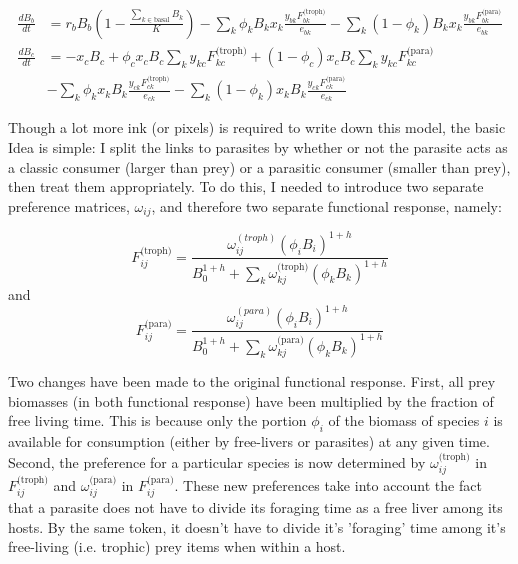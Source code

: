 \documentclass[11pt]{amsart}
\begin{document}
\begin{align}
\frac{dB_{b}}{dt} &= r_bB_b\left(1-\frac{\sum_{k\in\text{basal}}B_k}{K}\right) - \sum_k\phi_kB_kx_k\frac{y_{bk}F_{bk}^\text{(troph)}}{e_{bk}} - \sum_k(1-\phi_k)B_kx_k\frac{y_{bk}F^\text{(para)}_{bk}}{e_{bk}}\label{basalEq1} \\ 
\frac{dB_{c}}{dt} &= -x_cB_c + \phi_cx_cB_c\sum_ky_{kc}F^\text{(troph)}_{kc} + (1-\phi_c)x_cB_c\sum_ky_{kc}F^\text{(para)}_{kc} \label{conEq1}\\ 
&- \sum_k \phi_kx_kB_k\frac{y_{ck}F^\text{(troph)}_{ck}}{e_{ck}} - \sum_k (1-\phi_k)x_kB_k\frac{y_{ck}F^\text{(para)}_{ck}}{e_{ck}}\nonumber
\end{align}

Though a lot more ink (or pixels) is required to write down this model, the basic Idea is simple: I split the links to parasites by whether or not the parasite acts as a classic consumer (larger than prey) or a parasitic consumer (smaller than prey), then treat them appropriately.  To do this, I needed to introduce two separate  preference matrices, $\omega_{ij}$, and therefore two separate functional response, namely:

\begin{equation}
F_{ij}^\text{(troph)} = \frac{\omega_{ij}^{(troph)}(\phi_iB_i)^{1+h}}{B_0^{1+h} + \sum_k\omega^\text{(troph)}_{kj}(\phi_kB_k)^{1+h}} \label{FR1Troph}
\end{equation}
and
\begin{equation}
F_{ij}^\text{(para)} = \frac{\omega_{ij}^{(para)}(\phi_iB_i)^{1+h}}{B_0^{1+h} + \sum_k\omega^\text{(para)}_{kj}(\phi_kB_k)^{1+h}} \label{FR1Para}
\end{equation}

Two changes have been made to the original functional response.  First, all prey biomasses (in both functional response) have been multiplied by the fraction of free living time.  This is because only the portion $\phi_i$ of the biomass of species $i$ is available for consumption (either by free-livers or parasites) at any given time.  Second, the preference for a particular species is now determined by $\omega_{ij}^\text{(troph)}$ in $F_{ij}^\text{(troph)}$ and $\omega_{ij}^\text{(para)}$ in $F_{ij}^\text{(para)}$.  These new preferences take into account the fact that a parasite does not have to divide its foraging time as a free liver among its hosts.  By the same token, it doesn't have to divide it's 'foraging' time among it's free-living (i.e. trophic) prey items when within a host.
\end{document}
